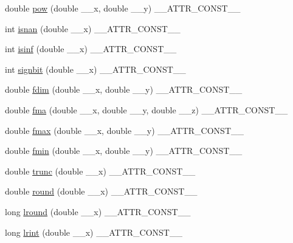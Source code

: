 \begin{DoxyCompactItemize}
\item 
double \hyperlink{group__avr__math_gaa9a9885e972736204c941a7e9db0ffe2}{pow} (double \+\_\+\+\_\+x, double \+\_\+\+\_\+y) \+\_\+\+\_\+\+A\+T\+T\+R\+\_\+\+C\+O\+N\+S\+T\+\_\+\+\_\+
\item 
int \hyperlink{group__avr__math_gafa5b3d99af3bf027f5742e5c0e6b7095}{isnan} (double \+\_\+\+\_\+x) \+\_\+\+\_\+\+A\+T\+T\+R\+\_\+\+C\+O\+N\+S\+T\+\_\+\+\_\+
\item 
int \hyperlink{group__avr__math_ga7958c6f2498eaf51798f80de9fcfe9d0}{isinf} (double \+\_\+\+\_\+x) \+\_\+\+\_\+\+A\+T\+T\+R\+\_\+\+C\+O\+N\+S\+T\+\_\+\+\_\+
\item 
int \hyperlink{group__avr__math_ga630a57ee687f001f8e5a218c9b79f50b}{signbit} (double \+\_\+\+\_\+x) \+\_\+\+\_\+\+A\+T\+T\+R\+\_\+\+C\+O\+N\+S\+T\+\_\+\+\_\+
\item 
double \hyperlink{group__avr__math_ga83281f9f08e93c6c388623d225ab3096}{fdim} (double \+\_\+\+\_\+x, double \+\_\+\+\_\+y) \+\_\+\+\_\+\+A\+T\+T\+R\+\_\+\+C\+O\+N\+S\+T\+\_\+\+\_\+
\item 
double \hyperlink{group__avr__math_ga82029dbf001eaea490ba44d439cbd660}{fma} (double \+\_\+\+\_\+x, double \+\_\+\+\_\+y, double \+\_\+\+\_\+z) \+\_\+\+\_\+\+A\+T\+T\+R\+\_\+\+C\+O\+N\+S\+T\+\_\+\+\_\+
\item 
double \hyperlink{group__avr__math_ga826d43c13b1800b7c906bd35e31ee15f}{fmax} (double \+\_\+\+\_\+x, double \+\_\+\+\_\+y) \+\_\+\+\_\+\+A\+T\+T\+R\+\_\+\+C\+O\+N\+S\+T\+\_\+\+\_\+
\item 
double \hyperlink{group__avr__math_gae5e2dea618087cda44f0998821c26c48}{fmin} (double \+\_\+\+\_\+x, double \+\_\+\+\_\+y) \+\_\+\+\_\+\+A\+T\+T\+R\+\_\+\+C\+O\+N\+S\+T\+\_\+\+\_\+
\item 
double \hyperlink{group__avr__math_ga63f7d01fc9b6a91bca4f71089213ea42}{trunc} (double \+\_\+\+\_\+x) \+\_\+\+\_\+\+A\+T\+T\+R\+\_\+\+C\+O\+N\+S\+T\+\_\+\+\_\+
\item 
double \hyperlink{group__avr__math_ga79dbf1906373fcc3bf5edf1ec91674cc}{round} (double \+\_\+\+\_\+x) \+\_\+\+\_\+\+A\+T\+T\+R\+\_\+\+C\+O\+N\+S\+T\+\_\+\+\_\+
\item 
long \hyperlink{group__avr__math_gaf3029ef77cd160704ed157c0353cd631}{lround} (double \+\_\+\+\_\+x) \+\_\+\+\_\+\+A\+T\+T\+R\+\_\+\+C\+O\+N\+S\+T\+\_\+\+\_\+
\item 
long \hyperlink{group__avr__math_gab6b0c151da73204150528ee81ef45e02}{lrint} (double \+\_\+\+\_\+x) \+\_\+\+\_\+\+A\+T\+T\+R\+\_\+\+C\+O\+N\+S\+T\+\_\+\+\_\+
\end{DoxyCompactItemize}


